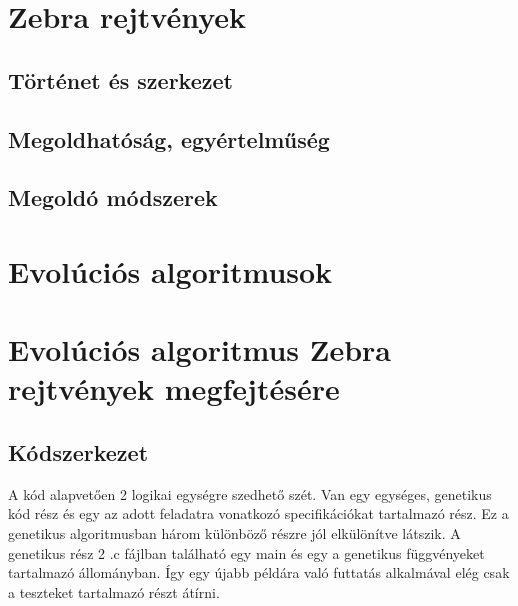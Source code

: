 \documentclass[12ppt,a4paper,oneside]{report}
\begin{document}
\chapter{Zebra rejtvények} %
    
    \section{Történet és szerkezet} %

    \section{Megoldhatóság, egyértelműség} %

    \section{Megoldó módszerek} %

\chapter{Evolúciós algoritmusok} %

\chapter{Evolúciós algoritmus Zebra rejtvények megfejtésére} %

    \section{Kódszerkezet} %
			{A kód alapvetően 2 logikai egységre szedhető szét. Van egy egységes, genetikus kód rész és egy az adott feladatra vonatkozó specifikációkat tartalmazó rész. Ez a genetikus algoritmusban három különböző részre jól elkülönítve látszik. A genetikus rész 2 .c fájlban található egy main és egy a genetikus függvényeket tartalmazó állományban. Így egy újabb példára való futtatás alkalmával elég csak a teszteket tartalmazó részt átírni.}
			
\end{document}

